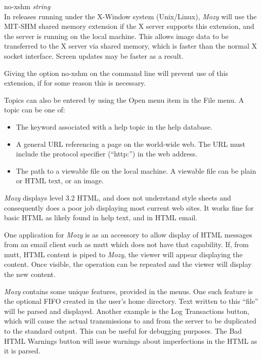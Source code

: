 \begin{description}
\item{\et {}no-xshm} {\it string}\\
In releases running under the X-Window system (Unix/Linux), {\it Mozy}
will use the MIT-SHM shared memory extension if the X server supports
this extension, and the server is running on the local machine.  This
allows image data to be transferred to the X server via shared memory,
which is faster than the normal X socket interface.  Screen updates
may be faster as a result.

Giving the option {\et {}no-xshm} on the command
line will prevent use of this extension, if for some reason this is
necessary.
\end{description}

Topics can also be entered by using the {\cb Open} menu item in the
{\cb File} menu.  A topic can be one of:

\begin{itemize}
\item{The keyword associated with a help topic in the help database.}

\item{A general URL referencing a page on the world-wide web.  The
URL must include the protocol specifier (``{\vt http:}'') in the
web address.}

\item{The path to a viewable file on the local machine.  A viewable
file can be plain or HTML text, or an image.}
\end{itemize}

{\it Mozy} displays level 3.2 HTML, and does not understand style
sheets and consequently does a poor job displaying most current web
sites.  It works fine for basic HTML as likely found in help text, and
in HTML email.

One application for {\it Mozy} is as an accessory to allow display of
HTML messages from an email client such as {\vt mutt} which does not
have that capability.  If, from {\vt mutt}, HTML content is piped to
{\it Mozy}, the viewer will appear displaying the content.  Once
visible, the operation can be repeated and the viewer will display the
new content.

{\it Mozy} contains some unique features, provided in the menus.  One
such feature is the optional FIFO created in the user's home
directory.  Text written to this ``file'' will be parsed and
displayed.  Another example is the {\cb Log Transactions} button,
which will cause the actual transmissions to and from the server to be
duplicated to the standard output.  This can be useful for debugging
purposes.  The {\cb Bad HTML Warnings} button will issue warnings
about imperfections in the HTML as it is parsed.

